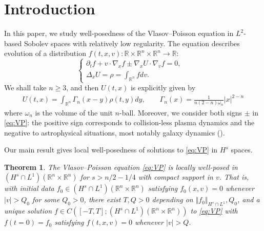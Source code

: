 \documentclass[11pt]{amsart}
\newtheorem{theorem}{Theorem}[section]
\theoremstyle{definition}
\theoremstyle{remark}
\numberwithin{equation}{section}
\newcommand{\nrm}[1]{\Vert#1\Vert}
\newcommand{\lap}{\Delta}
\newcommand{\rd}{\partial}
\newcommand{\nb}{\nabla}
\newcommand{\0}{\emptyset}
\newcommand{\Gmm}{\Gamma}
\newcommand{\omg}{\omega}
\newcommand{\bbR}{\mathbb R}
\begin{document}
	\section{Introduction}
	In this paper, we study well-posedness of the Vlasov--Poisson equation in $L^{2}$-based Sobolev spaces with relatively low regularity. The equation describes evolution of a distribution $f(t,x,v) : \bbR \times \bbR^n \times \bbR^n \to \bbR $: 
	\begin{equation}\label{eq:VP} \tag{VP}
		\left\{
		\begin{aligned}
			\rd_{t} f + v \cdot \nb_{x} f \pm \nb_{x} U \cdot \nb_{v} f = 0, & \\
			\lap_{x} U = \rho = \int_{\bbR^{n}} f dv. & 
		\end{aligned}
		\right.
	\end{equation} 	We shall take $n \ge 3$, and then $U(t,x)$ is explicitly given by \begin{equation*}
		\begin{split}
			U(t,x) = \int_{\bbR^{n}}  \Gmm_{n}(x-y)  \rho(t,y) dy, \qquad 	\Gmm_{n}(x) = 
			\frac{1}{n(2-n)\omg_{n}} |x|^{2-n}
		\end{split}
	\end{equation*} where $\omg_{n}$ is the volume of the unit $n$-ball. Moreover, we consider both signs $\pm$ in \eqref{eq:VP}: the positive sign corresponds to collision-less plasma dynamics and the negative to astrophysical situations, most notably galaxy dynamics (\cite{Glassey96,Horst,Horst2}).
	
	
	Our main result gives local well-posedness of solutions to \eqref{eq:VP} in $H^{s}$ spaces.
	
	\begin{theorem}\label{thm:main}
		The Vlasov--Poisson equation \eqref{eq:VP} is locally well-posed in $(H^{s} \cap L^{1})(\bbR^{n} \times \bbR^{n})$ for $s> n/2 - 1/4$ with compact support in $v$. That is, with initial data $f_{0} \in (H^{s} \cap L^{1})(\bbR^{n} \times \bbR^{n})$ satisfying $f_{0}(x,v)  = 0$ whenever $|v|>Q_{0}$ for some $Q_{0}>0$, there exist $T, Q >0$ depending on $\nrm{f_{0}}_{H^{s}\cap L^{1}}, Q_{0}$, and a unique solution $f \in C([-T,T]; (H^{s} \cap L^{1})(\bbR^{n} \times \bbR^{n}))$ to \eqref{eq:VP} with $f(t=0) = f_{0}$ satisfying $f(t,x,v) = 0$ whenever $|v| > Q$. 
	\end{theorem}
	
\end{document}
